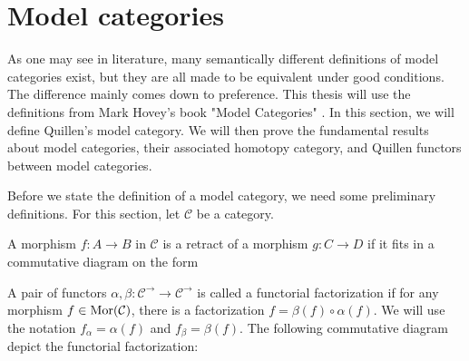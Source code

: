 \documentclass[../thesis.tex]{subfiles}
\begin{document}
    \section{Model categories}

        As one may see in literature, many semantically different definitions of model categories exist, but they are all made to be equivalent under good conditions. The difference mainly comes down to preference. This thesis will use the definitions from Mark Hovey's book "Model Categories" \cite{Hovey99}. In this section, we will define Quillen's model category. We will then prove the fundamental results about model categories, their associated homotopy category, and Quillen functors between model categories.

        Before we state the definition of a model category, we need some preliminary definitions. For this section, let $\mathcal{C}$ be a category.

        \begin{definition}[Retract]
            A morphism $f:A\rightarrow B$ in $\mathcal{C}$ is a retract of a morphism $g: C\rightarrow D$ if it fits in a commutative diagram on the form
            \begin{center}
            \end{center}
        \end{definition}

        \begin{definition}
            A pair of functors $\alpha, \beta: \mathcal{C}^\rightarrow\rightarrow\mathcal{C}^\rightarrow$ is called a functorial factorization if for any morphism $f\in \tt{Mor}(\mathcal{C})$, there is a factorization $f = \beta(f)\circ\alpha(f)$. We will use the notation $f_\alpha = \alpha(f)$ and $f_\beta = \beta(f)$. The following commutative diagram depict the functorial factorization:
            \begin{center}
            \end{center}
        \end{definition}
\end{document}
